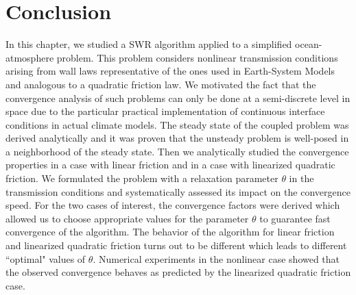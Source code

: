 \section{Conclusion}
In this chapter, we studied a SWR %
algorithm applied
to a simplified ocean-atmosphere problem. 
This problem considers nonlinear transmission conditions arising 
from wall laws representative of the ones used in Earth-System Models
and analogous to a quadratic friction law. We 
motivated the fact that the convergence analysis of such 
problems can only be done at a semi-discrete level in space due to the particular practical implementation of continuous interface conditions in actual climate models.  
The steady state of the coupled problem was derived analytically
and it was proven that the unsteady problem is well-posed
in a neighborhood of the steady state.
Then we analytically studied the convergence properties in a
case with linear friction and in a case with linearized 
quadratic friction. We formulated the problem with a 
relaxation parameter $\theta$ in the transmission conditions and 
systematically assessed its impact on the convergence speed. 
%
%
%
%
For the two cases of interest, the convergence factors were derived
which allowed us to choose appropriate values
for the parameter $\theta$ to guarantee fast convergence of the algorithm.
%
The behavior of the algorithm for linear friction and linearized 
quadratic friction turns out to be different which leads to different
``optimal" values of $\theta$. 
%
%
Numerical experiments in the nonlinear case showed that the observed 
convergence behaves as predicted by the linearized quadratic friction
case.
